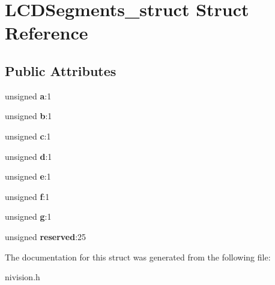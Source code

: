 \hypertarget{structLCDSegments__struct}{
\section{LCDSegments\_\-struct Struct Reference}
\label{structLCDSegments__struct}
}
\subsection*{Public Attributes}
\begin{DoxyCompactItemize}
\item 
\hypertarget{structLCDSegments__struct_ad0992c4d20b0deedf72a5f6da9807442}{
unsigned {\bfseries a}:1}
\label{structLCDSegments__struct_ad0992c4d20b0deedf72a5f6da9807442}

\item 
\hypertarget{structLCDSegments__struct_a8e56fb087d3fc7a8b2dc9b3c5e47b1c4}{
unsigned {\bfseries b}:1}
\label{structLCDSegments__struct_a8e56fb087d3fc7a8b2dc9b3c5e47b1c4}

\item 
\hypertarget{structLCDSegments__struct_a4cb2e9b683f2dba54db8a9fea9284955}{
unsigned {\bfseries c}:1}
\label{structLCDSegments__struct_a4cb2e9b683f2dba54db8a9fea9284955}

\item 
\hypertarget{structLCDSegments__struct_acacc4a4b025fc4a2e6738ca80a283929}{
unsigned {\bfseries d}:1}
\label{structLCDSegments__struct_acacc4a4b025fc4a2e6738ca80a283929}

\item 
\hypertarget{structLCDSegments__struct_a8af46cabd3ee9c9242e42f79809b8e5e}{
unsigned {\bfseries e}:1}
\label{structLCDSegments__struct_a8af46cabd3ee9c9242e42f79809b8e5e}

\item 
\hypertarget{structLCDSegments__struct_a843b60988db8efa6c5fef4e986306d80}{
unsigned {\bfseries f}:1}
\label{structLCDSegments__struct_a843b60988db8efa6c5fef4e986306d80}

\item 
\hypertarget{structLCDSegments__struct_a21f91e9e7b539e470c7d4117efdd6579}{
unsigned {\bfseries g}:1}
\label{structLCDSegments__struct_a21f91e9e7b539e470c7d4117efdd6579}

\item 
\hypertarget{structLCDSegments__struct_aae144e3a95d1a95d16485c4112ccbbc5}{
unsigned {\bfseries reserved}:25}
\label{structLCDSegments__struct_aae144e3a95d1a95d16485c4112ccbbc5}

\end{DoxyCompactItemize}


The documentation for this struct was generated from the following file:\begin{DoxyCompactItemize}
\item 
nivision.h\end{DoxyCompactItemize}

